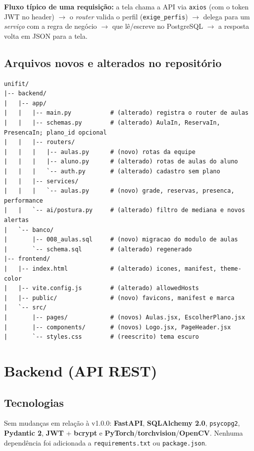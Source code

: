 \documentclass[11pt,a4paper]{article}
\newcommand{\cod}[1]{\texttt{#1}}
\begin{document}
\textbf{Fluxo típico de uma requisição:} a tela chama a API via \cod{axios} (com o token JWT no
header) $\rightarrow$ o \textit{router} valida o perfil (\cod{exige\_perfis}) $\rightarrow$
delega para um \textit{serviço} com a regra de negócio $\rightarrow$ que lê/escreve no PostgreSQL
$\rightarrow$ a resposta volta em JSON para a tela.

\subsection{Arquivos novos e alterados no repositório}

\begin{lstlisting}
unifit/
|-- backend/
|   |-- app/
|   |   |-- main.py           # (alterado) registra o router de aulas
|   |   |-- schemas.py        # (alterado) AulaIn, ReservaIn, PresencaIn; plano_id opcional
|   |   |-- routers/
|   |   |   |-- aulas.py      # (novo) rotas da equipe
|   |   |   |-- aluno.py      # (alterado) rotas de aulas do aluno
|   |   |   `-- auth.py       # (alterado) cadastro sem plano
|   |   |-- services/
|   |   |   `-- aulas.py      # (novo) grade, reservas, presenca, performance
|   |   `-- ai/postura.py     # (alterado) filtro de mediana e novos alertas
|   `-- banco/
|       |-- 008_aulas.sql     # (novo) migracao do modulo de aulas
|       `-- schema.sql        # (alterado) regenerado
|-- frontend/
|   |-- index.html            # (alterado) icones, manifest, theme-color
|   |-- vite.config.js        # (alterado) allowedHosts
|   |-- public/               # (novo) favicons, manifest e marca
|   `-- src/
|       |-- pages/            # (novos) Aulas.jsx, EscolherPlano.jsx
|       |-- components/       # (novos) Logo.jsx, PageHeader.jsx
|       `-- styles.css        # (reescrito) tema escuro
\end{lstlisting}

\section{Backend (API REST)}

\subsection{Tecnologias}

Sem mudanças em relação à v1.0.0: \textbf{FastAPI}, \textbf{SQLAlchemy 2.0}, \cod{psycopg2},
\textbf{Pydantic 2}, \textbf{JWT} + \textbf{bcrypt} e \textbf{PyTorch}/\textbf{torchvision}/\textbf{OpenCV}.
Nenhuma dependência foi adicionada a \cod{requirements.txt} ou \cod{package.json}.
\end{document}
